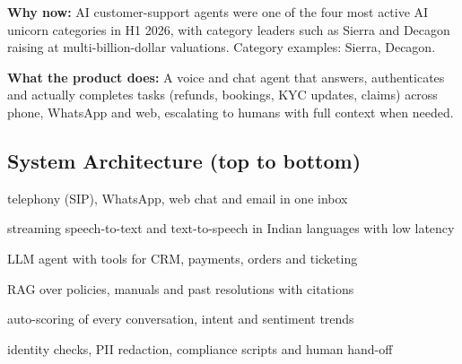 \documentclass[10pt,a4paper]{article}
\begin{document}
\begin{tcolorbox}[colback=l1bg,colframe=l1bg,arc=2pt,borderline west={3pt}{0pt}{saffron},top=2pt,bottom=2pt]\small\textbf{Why now:} AI customer-support agents were one of the four most active AI unicorn categories in H1 2026, with category leaders such as Sierra and Decagon raising at multi-billion-dollar valuations. {\color{muted}Category examples: Sierra, Decagon.}\end{tcolorbox}
\begin{tcolorbox}[colback=l3bg,colframe=l3bg,arc=2pt,borderline west={3pt}{0pt}{igreen},top=2pt,bottom=2pt]\small\textbf{What the product does:} A voice and chat agent that answers, authenticates and actually completes tasks (refunds, bookings, KYC updates, claims) across phone, WhatsApp and web, escalating to humans with full context when needed.\end{tcolorbox}
\subsection*{System Architecture (top to bottom)}
\begin{tcolorbox}[colback=lay0,colframe=lay0,arc=2pt,top=1.5pt,bottom=1.5pt,left=6pt,before skip=2pt,after skip=2pt]\small{} telephony (SIP), WhatsApp, web chat and email in one inbox\end{tcolorbox}
\begin{tcolorbox}[colback=lay1,colframe=lay1,arc=2pt,top=1.5pt,bottom=1.5pt,left=6pt,before skip=2pt,after skip=2pt]\small{} streaming speech-to-text and text-to-speech in Indian languages with low latency\end{tcolorbox}
\begin{tcolorbox}[colback=lay2,colframe=lay2,arc=2pt,top=1.5pt,bottom=1.5pt,left=6pt,before skip=2pt,after skip=2pt]\small{} LLM agent with tools for CRM, payments, orders and ticketing\end{tcolorbox}
\begin{tcolorbox}[colback=lay3,colframe=lay3,arc=2pt,top=1.5pt,bottom=1.5pt,left=6pt,before skip=2pt,after skip=2pt]\small{} RAG over policies, manuals and past resolutions with citations\end{tcolorbox}
\begin{tcolorbox}[colback=lay4,colframe=lay4,arc=2pt,top=1.5pt,bottom=1.5pt,left=6pt,before skip=2pt,after skip=2pt]\small{} auto-scoring of every conversation, intent and sentiment trends\end{tcolorbox}
\begin{tcolorbox}[colback=lay5,colframe=lay5,arc=2pt,top=1.5pt,bottom=1.5pt,left=6pt,before skip=2pt,after skip=2pt]\small{} identity checks, PII redaction, compliance scripts and human hand-off\end{tcolorbox}
\end{document}

